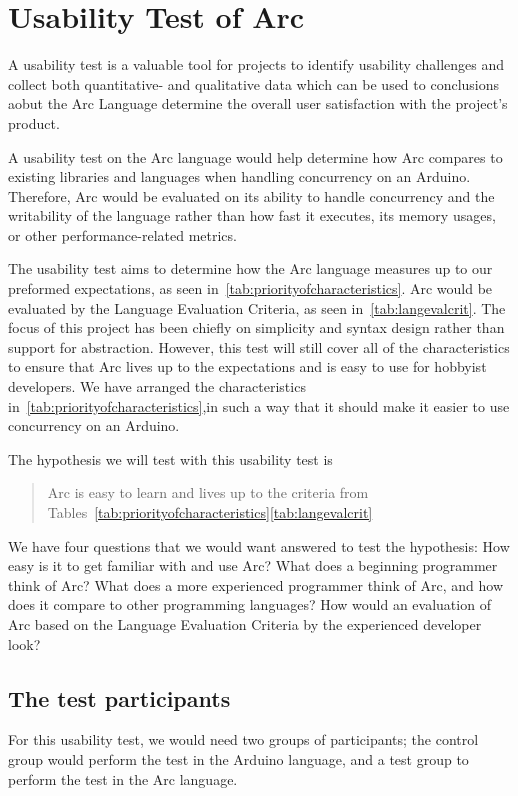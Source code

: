 \section{Usability Test of Arc}\label{subsec:usabilityTestOfArc}
A usability test is a valuable tool for projects to identify usability challenges and collect both quantitative- and qualitative data which can be used to conclusions aobut the Arc Language
determine the overall user satisfaction with the project's product.

A usability test on the Arc language would help determine how Arc compares to existing libraries and languages when handling concurrency on an Arduino. Therefore, Arc would be evaluated on its ability to handle concurrency and the writability of the language rather than how fast it executes, its memory usages, or other performance-related metrics.

The usability test aims to determine how the Arc language measures up to our preformed expectations, as seen in~\ref{tab:priorityofcharacteristics}. Arc would be evaluated by the Language Evaluation Criteria, as seen in~\ref{tab:langevalcrit}. The focus of this project has been chiefly on simplicity and syntax design rather than support for abstraction. However, this test will still cover all of the characteristics to ensure that Arc lives up to the expectations and is easy to use for hobbyist developers. We have arranged the characteristics in~\ref{tab:priorityofcharacteristics},in such a way that it should make it easier to use concurrency on an Arduino.

The hypothesis we will test with this usability test is 

\blockquote{Arc is easy to learn and lives up to the criteria from Tables~\ref{tab:priorityofcharacteristics}\ref{tab:langevalcrit}}

We have four questions that we would want answered to test the hypothesis: How easy is it to get familiar with and use Arc? What does a beginning programmer think of Arc? What does a more experienced programmer think of Arc, and how does it compare to other programming languages? How would an evaluation of Arc based on the Language Evaluation Criteria by the experienced developer look?

\subsection{The test participants}\label{subsubsec:theTestParticipants}
For this usability test, we would need two groups of participants; the control group would perform the test in the Arduino language, and a test group to perform the test in the Arc language.

